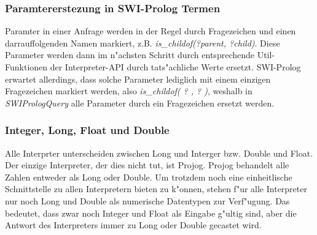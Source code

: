 \subsubsection{Paramtererstezung in SWI-Prolog Termen}
Paramter in einer Anfrage werden in der Regel durch Fragezeichen und einen darrauffolgenden Namen markiert, z.B. \emph{is\_childof(?parent, ?child)}. Diese Parameter werden dann im n"achsten Schritt durch entsprechende Util-Funktionen der Interpreter-API durch tats"achliche Werte ersetzt. SWI-Prolog erwartet allerdings, dass solche Parameter lediglich mit einem einzigen Fragezeichen markiert werden, also \emph{is\_childof( ? , ? )}, weshalb in \emph{SWIPrologQuery} alle Parameter durch ein Fragezeichen ersetzt werden.

\subsubsection{Integer, Long, Float und Double}
Alle Interprter unterscheiden zwischen Long und Interger bzw. Double und Float. Der einzige Interpreter, der dies nicht tut, ist Projog. Projog behandelt alle Zahlen entweder als Long oder Double. Um trotzdem noch eine einheitlische Schnittstelle zu allen Interpretern bieten zu k"onnen, stehen f"ur alle Interpreter nur noch Long und Double als numerische Datentypen zur Verf"ugung. Das bedeutet, dass zwar noch Integer und Float als Eingabe g"ultig sind, aber die Antwort des Interpreters immer zu Long oder Double gecastet wird.













